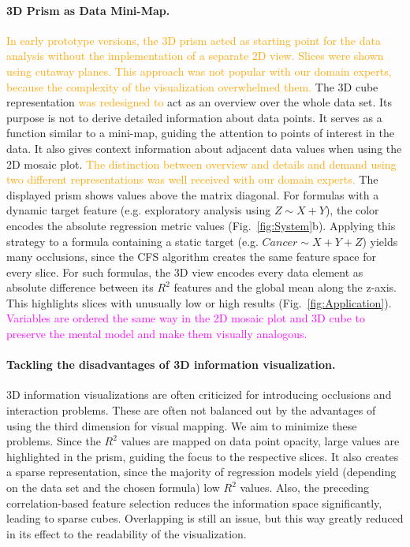 \documentclass[journal]{style/vgtc} 			          %
\newcommand{\design}[1]{\textcolor{orange}{#1}}
\newcommand{\magenta}[1]{\textcolor{magenta}{#1}}
\begin{document}
\paragraph{3D Prism as Data Mini-Map.}
\design{
In early prototype versions, the 3D prism acted as starting point for the data analysis without the implementation of a separate 2D view.
Slices were shown using cutaway planes.
This approach was not popular with our domain experts, because the complexity of the visualization overwhelmed them. %
}
The 3D cube representation \design{was redesigned to} act as an overview over the whole data set. 
Its purpose is not to derive detailed information about data points.
It serves as a function similar to a mini-map, guiding the attention to points of interest in the data.
It also gives context information about adjacent data values when using the 2D mosaic plot.
\design{The distinction between overview and details and demand using two different representations was well received with our domain experts.}
The displayed prism shows values above the matrix diagonal.
For formulas with a dynamic target feature (e.g. exploratory analysis using $Z \sim X + Y$), the color encodes the absolute regression metric values (Fig.~\ref{fig:System}b).
Applying this strategy to a formula containing a static target (e.g. $Cancer \sim X + Y + Z$) yields many occlusions, since the CFS algorithm creates the same feature space for every slice.
For such formulas, the 3D view encodes every data element as absolute difference between its $R^2$ features and the global mean along the z-axis.
This highlights slices with unusually low or high results (Fig.~\ref{fig:Application}).
\magenta{Variables are ordered the same way in the 2D mosaic plot and 3D cube to preserve the mental model and make them visually analogous.}

\paragraph{Tackling the disadvantages of 3D information visualization.}
3D information visualizations are often criticized for introducing occlusions and interaction problems.
These are often not balanced out by the advantages of using the third dimension for visual mapping.
We aim to minimize these problems.
Since the $R^2$ values are mapped on data point opacity, large values are highlighted in the prism, guiding the focus to the respective slices.
It also creates a sparse representation, since the majority of regression models yield (depending on the data set and the chosen formula) low $R^2$ values.
Also, the preceding correlation-based feature selection reduces the information space significantly, leading to sparse cubes.
Overlapping is still an issue, but this way greatly reduced in its effect to the readability of the visualization.
\end{document}
